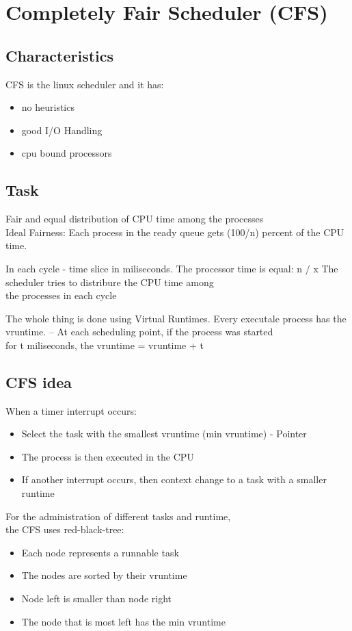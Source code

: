 \documentclass[a4paper, oneside]{scrreprt}
\begin{document}
\chapter{Completely Fair Scheduler (CFS)}

\section{Characteristics}

CFS is the linux scheduler and it has:
\begin{itemize}
	\item no heuristics
	\item good I/O Handling
	\item cpu bound processors
\end{itemize}

\section{Task}
Fair and equal distribution of CPU time among the processes\\
Ideal Fairness:
Each process in the ready queue gets (100/n) percent of the CPU time.

In each cycle - time slice in miliseconds. 
The processor time is equal: n / x
The scheduler tries to distribure the CPU time among \\the processes in each cycle

The whole thing is done using Virtual Runtimes. 
Every executale process has the vruntime.
-- At each scheduling point, if the process was started \\for t miliseconds, 
the vruntime = vruntime + t

\section{CFS idea}
When a timer interrupt occurs:
\begin{itemize}
\item Select the task with the smallest vruntime (min vruntime) - Pointer
\item The process is then executed in the CPU
  \item If another interrupt occurs, 
then context change to a task with a smaller runtime
\end{itemize}

For the administration of different tasks and runtime, \\the CFS uses red-black-tree:
\begin{itemize}
\item Each node represents a runnable task
\item The nodes are sorted by their vruntime
\item Node left is smaller than node right
\item The node that is most left has the min vruntime
\end{itemize}
\end{document}
